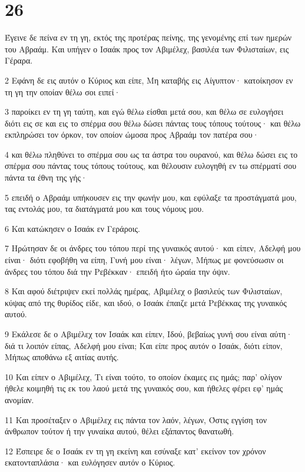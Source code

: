 \chapter{26}

\par Έγεινε δε πείνα εν τη γη, εκτός της προτέρας πείνης, της γενομένης επί των ημερών του Αβραάμ. Και υπήγεν ο Ισαάκ προς τον Αβιμέλεχ, βασιλέα των Φιλισταίων, εις Γέραρα.
\par 2 Εφάνη δε εις αυτόν ο Κύριος και είπε, Μη καταβής εις Αίγυπτον· κατοίκησον εν τη γη την οποίαν θέλω σοι ειπεί·
\par 3 παροίκει εν τη γη ταύτη, και εγώ θέλω είσθαι μετά σου, και θέλω σε ευλογήσει διότι εις σε και εις το σπέρμα σου θέλω δώσει πάντας τους τόπους τούτους· και θέλω εκπληρώσει τον όρκον, τον οποίον ώμοσα προς Αβραάμ τον πατέρα σου·
\par 4 και θέλω πληθύνει το σπέρμα σου ως τα άστρα του ουρανού, και θέλω δώσει εις το σπέρμα σου πάντας τους τόπους τούτους, και θέλουσιν ευλογηθή εν τω σπέρματί σου πάντα τα έθνη της γής·
\par 5 επειδή ο Αβραάμ υπήκουσεν εις την φωνήν μου, και εφύλαξε τα προστάγματά μου, τας εντολάς μου, τα διατάγματά μου και τους νόμους μου.
\par 6 Και κατώκησεν ο Ισαάκ εν Γεράροις.
\par 7 Ηρώτησαν δε οι άνδρες του τόπου περί της γυναικός αυτού· και είπεν, Αδελφή μου είναι· διότι εφοβήθη να είπη, Γυνή μου είναι· λέγων, Μήπως με φονεύσωσιν οι άνδρες του τόπου διά την Ρεβέκκαν· επειδή ήτο ώραία την όψιν.
\par 8 Και αφού διέτριψεν εκεί πολλάς ημέρας, Αβιμέλεχ ο βασιλεύς των Φιλισταίων, κύψας από της θυρίδος είδε, και ιδού, ο Ισαάκ έπαιζε μετά Ρεβέκκας της γυναικός αυτού.
\par 9 Εκάλεσε δε ο Αβιμέλεχ τον Ισαάκ και είπεν, Ιδού, βεβαίως γυνή σου είναι αύτη· διά τι λοιπόν είπας, Αδελφή μου είναι; Και είπε προς αυτόν ο Ισαάκ, διότι είπον, Μήπως αποθάνω εξ αιτίας αυτής.
\par 10 Και είπεν ο Αβιμέλεχ, Τι είναι τούτο, το οποίον έκαμες εις ημάς; παρ' ολίγον ήθελε κοιμηθή τις εκ του λαού μετά της γυναικός σου, και ήθελες φέρει εφ' ημάς ανομίαν.
\par 11 Και προσέταξεν ο Αβιμέλεχ εις πάντα τον λαόν, λέγων, Όστις εγγίση τον άνθρωπον τούτον ή την γυναίκα αυτού, θέλει εξάπαντος θανατωθή.
\par 12 Έσπειρε δε ο Ισαάκ εν τη γη εκείνη και εσύναξε κατ' εκείνον τον χρόνον εκατονταπλάσια· και ευλόγησεν αυτόν ο Κύριος.
